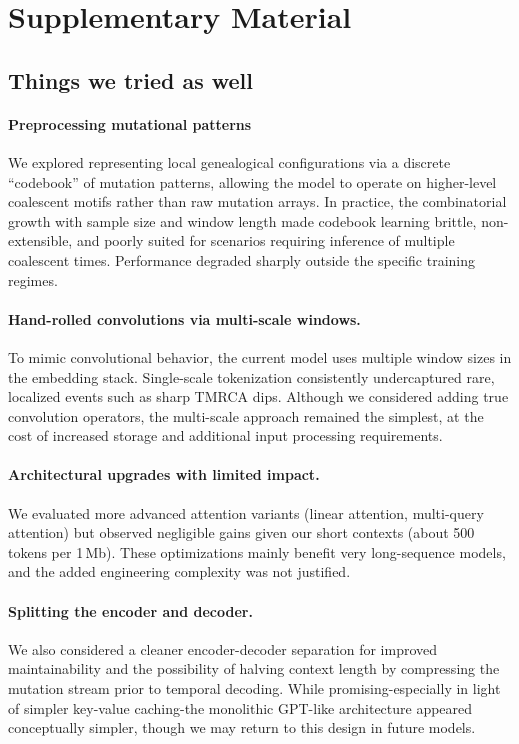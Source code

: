 \documentclass{article}
\begin{document}
\section*{Supplementary Material}

\subsection*{Things we tried as well}

\paragraph{Preprocessing mutational patterns}
We explored representing local genealogical configurations via a discrete
``codebook'' of mutation patterns, allowing the model to operate on higher-level
coalescent motifs rather than raw mutation arrays. In practice, the
combinatorial growth with sample size and window length made codebook learning
brittle, non-extensible, and poorly suited for scenarios requiring inference of
multiple coalescent times. Performance degraded sharply outside the specific
training regimes.

\paragraph{Hand-rolled convolutions via multi-scale windows.}
To mimic convolutional behavior, the current model uses multiple window sizes
in the embedding stack. Single-scale tokenization consistently undercaptured
rare, localized events such as sharp TMRCA dips. Although we considered adding
true convolution operators, the multi-scale approach remained the simplest, at the cost of increased storage and additional input processing requirements.

\paragraph{Architectural upgrades with limited impact.}
We evaluated more advanced attention variants (linear
attention, multi-query attention) but observed negligible gains given our short
contexts (about 500 tokens per 1\,Mb). These optimizations mainly benefit
very long-sequence models, and the added engineering complexity was not
justified.

\paragraph{Splitting the encoder and decoder.}
We also considered a cleaner encoder-decoder separation for improved
maintainability and the possibility of halving context length by compressing
the mutation stream prior to temporal decoding. While promising-especially in
light of simpler key-value caching-the monolithic GPT-like architecture appeared conceptually simpler, though we may return to this design in future models.
\end{document}
